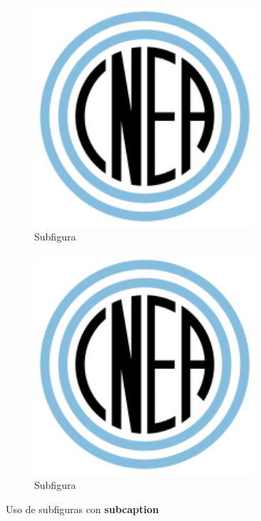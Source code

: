 \documentclass[a4paper,11pt,twoside]{MECOM}
\begin{document}
    \begin{figure}[ht]
        \centering
        \begin{subfigure}[t]{0.45\textwidth}
            \centering
            \includegraphics[width=0.9\textwidth]{Logo_CNEA}
            \caption{Subfigura}
            \label{fg:sub1}
        \end{subfigure}
        \begin{subfigure}[t]{0.45\textwidth}
            \centering
            \includegraphics[width=0.9\textwidth]{Logo_CNEA}
            \caption{Subfigura}
            \label{fg:sub2}
        \end{subfigure} 
        \caption{Uso de subfiguras con {\bf subcaption}}
        \label{fg:subfiguras}       
    \end{figure}    
    
\end{document}
